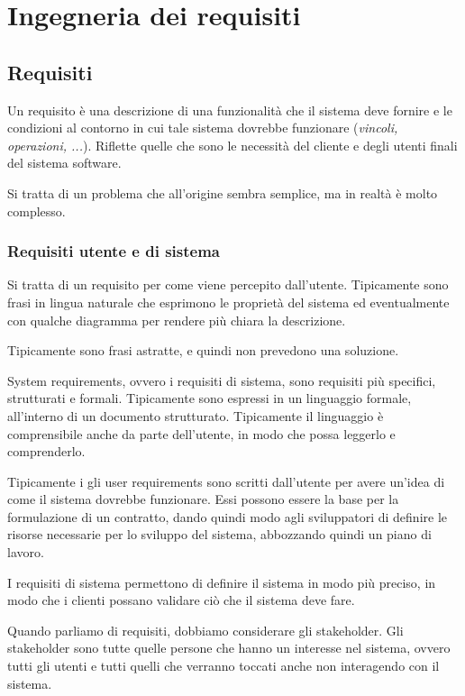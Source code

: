 \chapter{Ingegneria dei requisiti}
\section{Requisiti}
Un requisito è una descrizione di una funzionalità che il sistema deve
fornire e le condizioni al contorno in cui tale sistema dovrebbe funzionare
(\textit{vincoli, operazioni, ...}).
Riflette quelle che sono le necessità del cliente e degli utenti finali del sistema 
software.

Si tratta di un problema  che all'origine sembra semplice, ma in realtà è molto
complesso.
\subsection{Requisiti utente e di sistema}

\begin{tcolorbox}[title ={User requirements}]
Si tratta di un requisito per come viene percepito dall'utente. Tipicamente
sono frasi in lingua naturale che esprimono le proprietà del sistema ed eventualmente 
con qualche diagramma per rendere più chiara la descrizione.

Tipicamente sono frasi astratte, e quindi non prevedono una soluzione.
\end{tcolorbox}
\begin{tcolorbox}[title ={System requirements}]
System requirements, ovvero i requisiti di sistema, sono requisiti più specifici,
strutturati e formali. Tipicamente sono espressi in un linguaggio formale, all'interno 
di un documento strutturato. Tipicamente il linguaggio è comprensibile anche 
da parte dell'utente, in modo che possa leggerlo e comprenderlo.
\end{tcolorbox}
Tipicamente i gli user requirements sono scritti dall'utente per avere un'idea 
di come il sistema dovrebbe funzionare. Essi possono essere la base per la formulazione di 
un contratto, dando quindi modo agli sviluppatori di definire le risorse necessarie
per lo sviluppo del sistema, abbozzando quindi un piano di lavoro.

I requisiti di sistema permettono di definire il sistema in modo più preciso,
in modo che i clienti possano validare ciò che il sistema deve fare.
\begin{tcolorbox}[title = {Stakeholders}]
Quando parliamo di requisiti, dobbiamo considerare gli stakeholder.
Gli stakeholder sono tutte quelle persone che hanno un interesse nel sistema, 
ovvero tutti gli utenti e tutti quelli che verranno toccati anche non 
interagendo con il sistema.
\end{tcolorbox}

